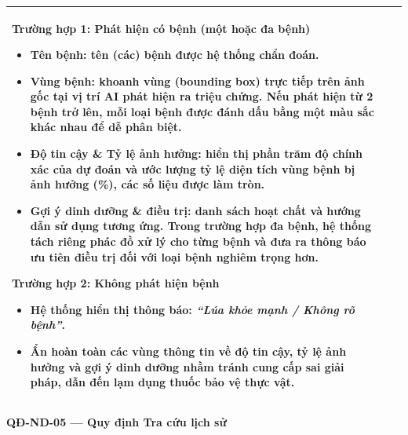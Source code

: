 \documentclass[12pt,a4paper]{article}
\begin{document}
\begin{longtable}{|
        >{\raggedright\arraybackslash}p{2.2cm}|
        >{\raggedright\arraybackslash}p{2.8cm}|
        >{\raggedright\arraybackslash}p{9.8cm}|}
    \textbf{Trường hợp 1: Phát hiện có bệnh (một hoặc đa bệnh)}
    \begin{itemize}[leftmargin=*,topsep=2pt,itemsep=1pt]
        \item \textbf{Tên bệnh:} tên (các) bệnh được hệ thống chẩn đoán.
        \item \textbf{Vùng bệnh:} khoanh vùng (bounding box) trực tiếp trên ảnh gốc tại vị trí AI phát hiện ra triệu chứng. Nếu phát hiện từ 2 bệnh trở lên, mỗi loại bệnh được đánh dấu bằng một màu sắc khác nhau để dễ phân biệt.
        \item \textbf{Độ tin cậy \& Tỷ lệ ảnh hưởng:} hiển thị phần trăm độ chính xác của dự đoán và ước lượng tỷ lệ diện tích vùng bệnh bị ảnh hưởng (\%), các số liệu được làm tròn.
        \item \textbf{Gợi ý dinh dưỡng \& điều trị:} danh sách hoạt chất và hướng dẫn sử dụng tương ứng. Trong trường hợp đa bệnh, hệ thống tách riêng phác đồ xử lý cho từng bệnh và đưa ra thông báo ưu tiên điều trị đối với loại bệnh nghiêm trọng hơn.
    \end{itemize}
    \vspace{2pt}

    \textbf{Trường hợp 2: Không phát hiện bệnh}
    \begin{itemize}[leftmargin=*,topsep=2pt,itemsep=1pt]
        \item Hệ thống hiển thị thông báo: \textbf{\textit{``Lúa khỏe mạnh / Không rõ bệnh''}}.
        \item Ẩn hoàn toàn các vùng thông tin về độ tin cậy, tỷ lệ ảnh hưởng và gợi ý dinh dưỡng nhằm tránh cung cấp sai giải pháp, dẫn đến lạm dụng thuốc bảo vệ thực vật.
    \end{itemize}                                                                                                                                                                                                               \\
    \hline
\end{longtable}

\vspace{0.3cm}
\noindent\textbf{QĐ-ND-05 --- Quy định Tra cứu lịch sử}
\end{document}
